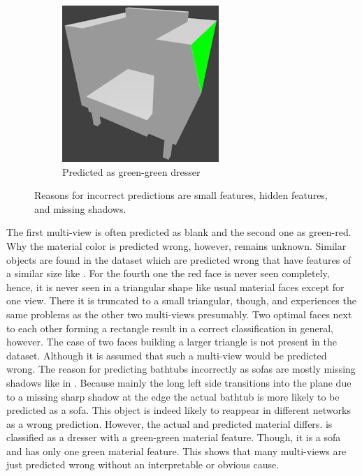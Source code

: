 \begin{figure}
\begin{subfigure}{.3\textwidth}
		\centering
		\includegraphics[width=.8\textwidth]{images/sofa_0681_1_010.png}
		\caption{Predicted as green-green dresser}
		\label{fig:small-features-f}
	\end{subfigure}
	\caption[Reasons for incorrect predictions]{Reasons for incorrect predictions are small features, hidden features, and missing shadows.}
	\label{fig:small-features}
\end{figure}
The first multi-view is often predicted as blank and the second one as green-red.
Why the material color is predicted wrong, however, remains unknown.
Similar objects are found in the dataset which are predicted wrong that have features of a similar size like .
For the fourth one the red face is never seen completely, hence, it is never seen in a triangular shape like usual material faces except for one view.
There it is truncated to a small triangular, though, and experiences the same problems as the other two multi-views presumably.
Two optimal faces next to each other forming a rectangle result in a correct classification in general, however.
The case of two faces building a larger triangle is not present in the dataset.
Although it is assumed that such a multi-view would be predicted wrong.
The reason for predicting bathtubs incorrectly as sofas are mostly missing shadows like in .
Because mainly the long left side transitions into the plane due to a missing sharp shadow at the edge the actual bathtub is more likely to be predicted as a sofa.
This object is indeed likely to reappear in different networks as a wrong prediction.
However, the actual and predicted material differs.
 is classified as a dresser with a green-green material feature.
Though, it is a sofa and has only one green material feature.
This shows that many multi-views are just predicted wrong without an interpretable or obvious cause.
